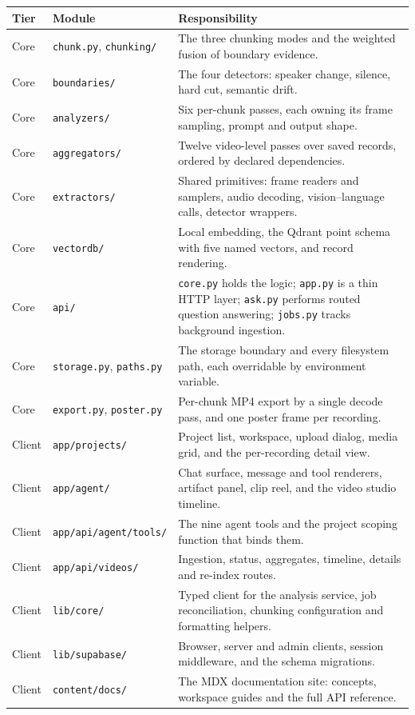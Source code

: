 \begin{table}[htbp]
\centering
\small
\begin{tabularx}{\textwidth}{@{}L{1.6cm}L{3.4cm}X@{}}
\toprule
\textbf{Tier} & \textbf{Module} & \textbf{Responsibility} \\
\midrule
Core & \texttt{chunk.py}, \texttt{chunking/} & The three chunking modes and the weighted fusion of boundary evidence. \\
Core & \texttt{boundaries/} & The four detectors: speaker change, silence, hard cut, semantic drift. \\
Core & \texttt{analyzers/} & Six per-chunk passes, each owning its frame sampling, prompt and output shape. \\
Core & \texttt{aggregators/} & Twelve video-level passes over saved records, ordered by declared dependencies. \\
Core & \texttt{extractors/} & Shared primitives: frame readers and samplers, audio decoding, vision--language calls, detector wrappers. \\
Core & \texttt{vectordb/} & Local embedding, the Qdrant point schema with five named vectors, and record rendering. \\
Core & \texttt{api/} & \texttt{core.py} holds the logic; \texttt{app.py} is a thin HTTP layer; \texttt{ask.py} performs routed question answering; \texttt{jobs.py} tracks background ingestion. \\
Core & \texttt{storage.py}, \texttt{paths.py} & The storage boundary and every filesystem path, each overridable by environment variable. \\
Core & \texttt{export.py}, \texttt{poster.py} & Per-chunk MP4 export by a single decode pass, and one poster frame per recording. \\
\midrule
Client & \texttt{app/projects/} & Project list, workspace, upload dialog, media grid, and the per-recording detail view. \\
Client & \texttt{app/agent/} & Chat surface, message and tool renderers, artifact panel, clip reel, and the video studio timeline. \\
Client & \texttt{app/api/agent/tools/} & The nine agent tools and the project scoping function that binds them. \\
Client & \texttt{app/api/videos/} & Ingestion, status, aggregates, timeline, details and re-index routes. \\
Client & \texttt{lib/core/} & Typed client for the analysis service, job reconciliation, chunking configuration and formatting helpers. \\
Client & \texttt{lib/supabase/} & Browser, server and admin clients, session middleware, and the schema migrations. \\
Client & \texttt{content/docs/} & The MDX documentation site: concepts, workspace guides and the full API reference. \\
\bottomrule
\end{tabularx}
\end{table}

